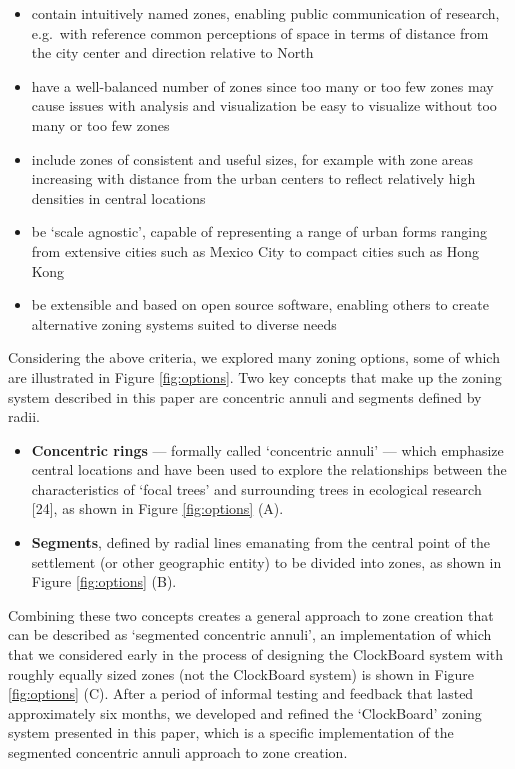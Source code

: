 \documentclass{josis}
\providecommand{\tightlist}{%
  \setlength{\itemsep}{0pt}\setlength{\parskip}{0pt}}
\begin{document}
\begin{itemize}
\tightlist
\item
  contain intuitively named zones, enabling public communication of research, e.g.~with reference common perceptions of space in terms of distance from the city center and direction relative to North
\item
  have a well-balanced number of zones since too many or too few zones may cause issues with analysis and visualization
  be easy to visualize without too many or too few zones
\item
  include zones of consistent and useful sizes, for example with zone areas increasing with distance from the urban centers to reflect relatively high densities in central locations
\item
  be `scale agnostic', capable of representing a range of urban forms ranging from extensive cities such as Mexico City to compact cities such as Hong Kong
\item
  be extensible and based on open source software, enabling others to create alternative zoning systems suited to diverse needs
\end{itemize}

Considering the above criteria, we explored many zoning options, some of which are illustrated in Figure \ref{fig:options}.
Two key concepts that make up the zoning system described in this paper are concentric annuli and segments defined by radii.

\begin{itemize}
\item
  \textbf{Concentric rings} --- formally called `concentric annuli' --- which emphasize central locations and have been used to explore the relationships between the characteristics of `focal trees' and surrounding trees in ecological research {[}24{]}, as shown in Figure \ref{fig:options} (A).
\item
  \textbf{Segments}, defined by radial lines emanating from the central point of the settlement (or other geographic entity) to be divided into zones, as shown in Figure \ref{fig:options} (B).
\end{itemize}

Combining these two concepts creates a general approach to zone creation that can be described as `segmented concentric annuli', an implementation of which that we considered early in the process of designing the ClockBoard system with roughly equally sized zones (not the ClockBoard system) is shown in Figure \ref{fig:options} (C).
After a period of informal testing and feedback that lasted approximately six months, we developed and refined the `ClockBoard' zoning system presented in this paper, which is a specific implementation of the segmented concentric annuli approach to zone creation.
\end{document}
